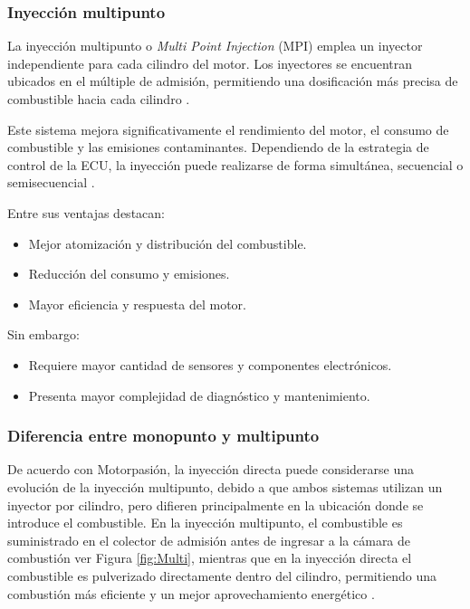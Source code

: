 \subsubsection{Inyección multipunto}

La inyección multipunto o \textit{Multi Point Injection} (MPI) emplea un inyector independiente para cada cilindro del motor. Los inyectores se encuentran ubicados en el múltiple de admisión, permitiendo una dosificación más precisa de combustible hacia cada cilindro \citep{Bosch_Automotive, web_inyeccion1}.

Este sistema mejora significativamente el rendimiento del motor, el consumo de combustible y las emisiones contaminantes. Dependiendo de la estrategia de control de la ECU, la inyección puede realizarse de forma simultánea, secuencial o semisecuencial \citep{web_inyeccion2}.

Entre sus ventajas destacan:
\begin{itemize}
    \item Mejor atomización y distribución del combustible.
    \item Reducción del consumo y emisiones.
    \item Mayor eficiencia y respuesta del motor.
\end{itemize}

Sin embargo:
\begin{itemize}
    \item Requiere mayor cantidad de sensores y componentes electrónicos.
    \item Presenta mayor complejidad de diagnóstico y mantenimiento.
\end{itemize}

\subsubsection{Diferencia entre monopunto y multipunto}
De acuerdo con Motorpasión, la inyección directa puede considerarse una evolución de la inyección multipunto, debido a que ambos sistemas utilizan un inyector por cilindro, pero difieren principalmente en la ubicación donde se introduce el combustible. En la inyección multipunto, el combustible es suministrado en el colector de admisión antes de ingresar a la cámara de combustión ver Figura \ref{fig:Multi}, mientras que en la inyección directa el combustible es pulverizado directamente dentro del cilindro, permitiendo una combustión más eficiente y un mejor aprovechamiento energético \citep{Motorpasion_Inyeccion}.

